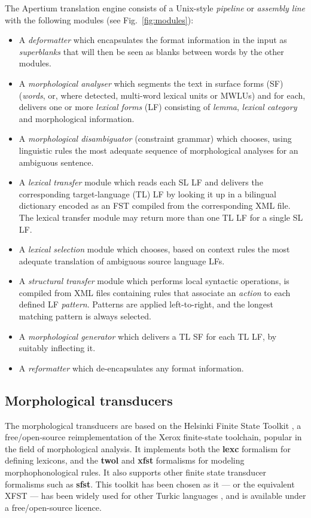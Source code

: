 \documentclass[a4paper,11pt]{article}
\newenvironment{itemise}[1]{
        \begin{itemize}\setlength{\itemsep}{-0.3em}
        \vspace{-0.6em}
        #1
}{
        \end{itemize}
        \vspace{-1pt}
}
\begin{document}
The Apertium translation engine consists of a Unix-style \emph{pipeline} or
\emph{assembly line} with the following modules (see Fig.~\ref{fig:modules}):  
\begin{itemise}
\item A \emph{deformatter} which encapsulates the format information
 in the input as \emph{superblanks} that will then be seen
 as blanks between words by the other modules.
\item A \emph{morphological analyser} which segments the text in
  surface forms (SF) (\emph{words}, or, where detected, multi-word lexical
  units or MWLUs) and for each, delivers one or more \emph{lexical
    forms} (LF) consisting of \emph{lemma}, \emph{lexical category} and
  morphological information. 
\item A \emph{morphological disambiguator} (constraint grammar) which chooses, using linguistic rules
  the most adequate sequence of morphological analyses for an ambiguous sentence. 
\item A \emph{lexical transfer} module which reads each SL LF 
  and delivers the corresponding target-language (TL) LF
  by looking it up in a bilingual dictionary encoded as an FST
  compiled from the corresponding XML file. The lexical transfer module may
  return more than one TL LF for a single SL LF.
\item A \emph{lexical selection} module \citep{tyers12a} which chooses, based on context 
  rules the most adequate translation of ambiguous source language LFs.
\item A \emph{structural transfer} module which
    performs local syntactic operations, is compiled from XML files containing rules that 
    associate an \emph{action} to each defined LF \emph{pattern}. Patterns are applied left-to-right, and the 
    longest matching pattern is always selected.
\item A \emph{morphological generator} which delivers a TL SF
 for each TL LF, by suitably inflecting it. 
\item A \emph{reformatter} which de-encapsulates any format
  information.
\end{itemise}


\subsection{Morphological transducers}

The morphological transducers are based on the Helsinki Finite State Toolkit \citep{hfst/2011}, a free/open-source reimplementation of the Xerox finite-state toolchain, popular in the field of morphological analysis. It implements both the \textbf{lexc} formalism for defining lexicons, and the \textbf{twol} and \textbf{xfst} formalisms for modeling morphophonological rules. It also supports other finite state transducer formalisms such as \textbf{sfst}. This toolkit has been chosen as it --- or the equivalent XFST --- has been widely used for other Turkic languages \citep{coltekin2010,altintas2001,tantug2006,washingtonipasovtyers12,tyerswashingtonsalimzyanbattalov12}, and is available under a free/open-source licence.
\end{document}
